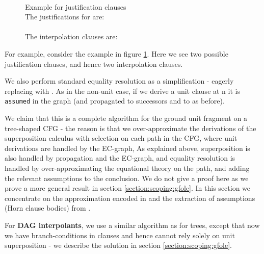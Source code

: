 \begin{figure}
\\
\caption{Example for justification clauses\\
The justifications for  are:\\
\\
The interpolation clauses are:\\
}
\label{example_4.2.2.1}
\end{figure}

\noindent
For example, consider the example in figure \ref{example_4.2.2.1}.
Here we see two possible justification clauses, and hence two interpolation clauses.

We also perform standard equality resolution as a simplification - eagerly replacing  with .
As in the non-unit case, if we derive a unit clause at n it is \lstinline|assumed| in the graph  (and propagated to successors and to  as before).

We claim that this is a complete algorithm for the ground unit fragment on a tree-shaped CFG - 
the reason is that we over-approximate the derivations of the superposition calculus with selection on each path in the CFG,
where unit derivations are handled by the EC-graph, As explained above, superposition is also handled by propagation and the EC-graph,
and equality resolution is handled by over-approximating the equational theory on the path, and adding the relevant assumptions to the conclusion. 
We do not give a proof here as we prove a more general result in section \ref{section:scoping:gfole}.
In this section we concentrate on the approximation encoded in  and the extraction of assumptions (Horn clause bodies) from .

For \textbf{DAG interpolants}, we use a similar algorithm as for trees, 
except that now we have branch-conditions in clauses and hence cannot rely solely on unit superposition - we describe the solution in section \ref{section:scoping:gfole}.

